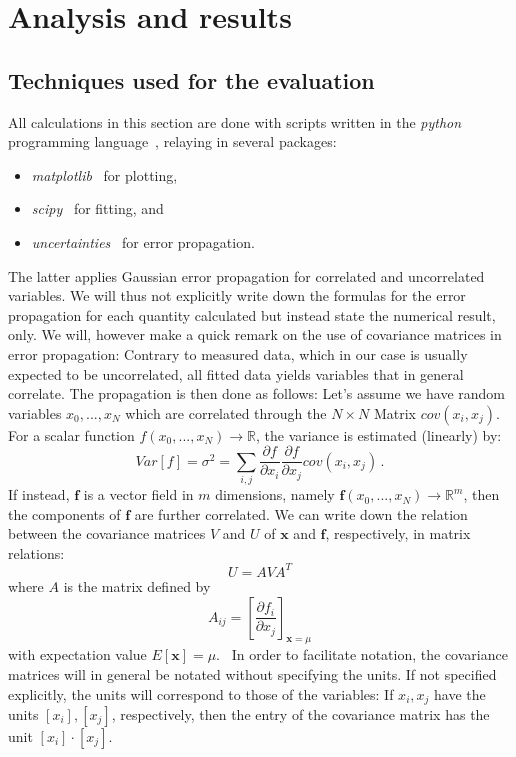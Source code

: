 \clearpage
\section{Analysis and results}
\label{sec:analysis}
\subsection{Techniques used for the evaluation}
All calculations in this section are done with scripts written in 
the \textit{python} programming language~\cite{python}, relaying in several 
packages:
\begin{itemize}
    \item
        \textit{matplotlib}~\cite{Hunter2007} for plotting,
    \item
        \textit{scipy}~\cite{scipy} for fitting, and 
    \item
        \textit{uncertainties}~\cite{uc} for error propagation.
\end{itemize}
The latter applies Gaussian error propagation for correlated and uncorrelated variables. 
We will thus not explicitly write down the formulas for the error propagation 
for each quantity calculated but instead state the numerical result, only. 
We will, however make a quick remark on the use of covariance matrices in 
error propagation: Contrary to measured data, which in our case is usually 
expected to be uncorrelated, all fitted data yields variables that in general correlate. 
The propagation is then done as follows:
Let's assume we have random
variables $x_0,...,x_N$ which are correlated through the $N\times N$ Matrix $cov(x_i,x_j)$.
For a scalar function $f(x_0,...,x_N) \rightarrow \mathbb{R}$, the variance is estimated (linearly) by:
\begin{equation}
Var[f] = \sigma^2 = \sum_{i,j} \frac{\partial f}{\partial x_i} \frac{\partial f}{\partial x_j} cov(x_i,x_j) \,.
\end{equation} 
If instead, $\mathbf{f}$ is a vector field in $m$ dimensions, namely 
$\mathbf{f}(x_0,...,x_N) \rightarrow \mathbb{R}^m$, then the components of $\mathbf{f}$ 
are further correlated. We can write down the relation between the covariance matrices $V$ and $U$ of 
$\mathbf{x}$ and $\mathbf{f}$, respectively, in matrix relations:
\begin{equation}
    U = A V A^T
\end{equation}
where $A$ is the matrix defined by 
\begin{equation}
    A_{ij} = \left[ \frac{\partial f_i}{\partial x_j}\right]_{\mathbf{x} = \mu}
\end{equation}
with expectation value $E[\mathbf{x}] = \mu$.~\cite{cowan1998statistical}
In order to facilitate notation, the covariance matrices will in general be notated without 
specifying the units. If not specified explicitly, the units will correspond to those of the
variables: If $x_i, x_j$ have the units $[x_i], [x_j]$, respectively, 
then the entry of the covariance matrix has the unit $[x_i] \cdot [x_j]$. 

